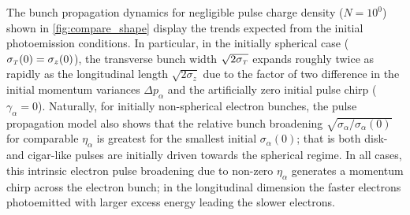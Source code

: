 The bunch propagation dynamics for negligible pulse charge density ($ N = 10^{0} $) shown in \ref{fig:compare_shape} display the trends expected from the initial photoemission conditions.
In particular, in the initially spherical case ($ \sigma_{{\scriptscriptstyle T}} (0) = \sigma_{z} (0) $), the transverse bunch width $ \sqrt{2 \sigma_{{\scriptscriptstyle T}}} $ expands roughly twice as rapidly as the longitudinal length $ \sqrt{2 \sigma_{z}} $ due to the factor of two difference in the initial momentum variances $ \Delta p_{\alpha} $ and the artificially zero initial pulse chirp ($ \gamma_{\alpha} = 0 $).
Naturally, for initially non-spherical electron bunches, the pulse propagation model also shows that the relative bunch broadening $ \sqrt{ \sigma_{\alpha} / \sigma_{\alpha} (0) } $ for comparable $ \eta_{\alpha} $ is greatest for the smallest initial $ \sigma_{\alpha} (0) $; that is both disk- and cigar-like pulses are initially driven towards the spherical regime.
In all cases, this intrinsic electron pulse broadening due to non-zero $ \eta_{\alpha} $ generates a momentum chirp across the electron bunch; in the longitudinal dimension the faster electrons photoemitted with larger excess energy leading the slower electrons.

